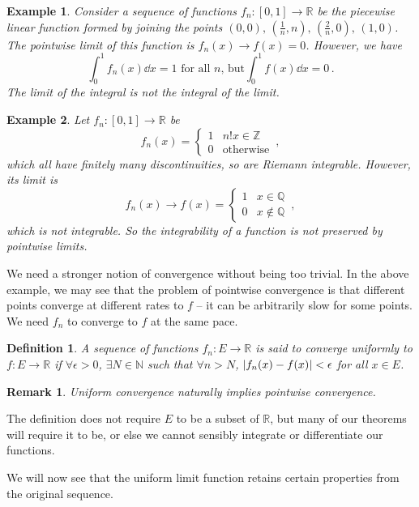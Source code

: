 \documentclass{article}
\theoremstyle{plain}\theoremheaderfont{\normalfont\itshape}\theorembodyfont{\rmfamily}\theoremseparator{.}\newtheorem*{rem}{Remark}\newtheorem*{ex}{Example}\newtheorem*{proof}{Proof}\newtheorem*{altp}{Alternative proof}
\theoremstyle{plain}\theoremheaderfont{\normalfont\bfseries}\theorembodyfont{\rmfamily}\theoremseparator{.}\newtheorem{thm}{Theorem}[section]\newtheorem{lem}[thm]{Lemma}\newtheorem{prop}[thm]{Proposition}\newtheorem*{cor}{Corollary}\newtheorem{defn}[thm]{Definition}\newtheorem{clm}[thm]{Claim}\newtheorem{clminproof}{Claim}
\theoremstyle{break}\theoremheaderfont{\normalfont\itshape}\theorembodyfont{\rmfamily}\theoremseparator{.\medskip}\newtheorem*{proofskip}{Proof}\newtheorem*{exs}{Examples}\newtheorem*{rems}{Remarks}
\theoremstyle{break}\theoremheaderfont{\normalfont\bfseries}\theorembodyfont{\rmfamily}\theoremseparator{.\medskip}\newtheorem{lemskip}[thm]{Lemma}\newtheorem{defnskip}[thm]{Definition}\newtheorem{propskip}[thm]{Proposition}\newtheorem{thmskip}[thm]{Theorem}
\begin{document}
	\begin{ex}
		Consider a sequence of functions \(f_n:[0,1]\to\mathbb{R}\) be the piecewise linear function formed by joining the points \((0,0),\,(\frac{1}{n},n),\,(\frac{2}{n},0),\,(1,0)\). The pointwise limit of this function is \(f_n(x)\to f(x)=0\). However, we have
		\[\int_{0}^{1}f_n(x)\dd{x}=1\text{ for all }n\text{, but}\int_0^1 f(x)\dd{x}=0\,.\]
		The limit of the integral is not the integral of the limit.
	\end{ex}

	\begin{ex}
		Let \(f_n:[0,1]\to\mathbb{R}\) be
		\[f_n(x)=\begin{cases}
			1 & n! x\in\mathbb{Z}\\
			0 & \text{otherwise}
		\end{cases}\,,\]
		which all have finitely many discontinuities, so are Riemann integrable. However, its limit is
		\[f_n(x)\to f(x)=\begin{cases}
			1 & x\in\mathbb{Q}\\
			0 & x\notin\mathbb{Q}
		\end{cases}\,,\]
		which is not integrable. So the integrability of a function is not preserved by pointwise
		limits.
	\end{ex}

    We need a stronger notion of convergence without being too trivial. In the above example, we may see that the problem of pointwise convergence is that different points converge at different rates to \(f\) -- it can be arbitrarily slow for some points. We need \(f_n\) to converge to \(f\) at the same pace.

	\begin{defn}
		A sequence of functions \(f_n:E\to\mathbb{R}\) is said to \textit{converge uniformly} to \(f:E\to\mathbb{R}\) if \(\forall\epsilon>0\), \(\exists N\in\mathbb{N}\) such that \(\forall n>N\), \(\abs{f_n(x)-f(x)}<\epsilon\) for all \(x\in E\).
	\end{defn}

    \begin{rem}
        Uniform convergence naturally implies pointwise convergence.
    \end{rem}
    
    The definition does not require \(E\) to be a subset of \(\mathbb{R}\), but many of our theorems will require it to be, or else we cannot sensibly integrate or differentiate our functions.
    
    We will now see that the uniform limit function retains certain properties from the original sequence.
\end{document}
